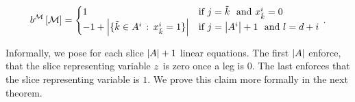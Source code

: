 \begin{align}\label{eq:ilpRhs}
	\rhsofat{\sliceset}{\datvariable=\datanum_{\decindex}+\datindex} =
	\begin{cases}
		1 & \text{if }  \datindex = \seccatenumerator \text{ and } \catindexof{\seccatenumerator}^{\decindex} = 0 \\ %
		-1 + \cardof{\{\seccatenumerator\in\variablesetof{\decindex} \, : \,  \catindexof{\seccatenumerator}^{\decindex} = 1\}}  & \text{if }  \datindex = \cardof{\variablesetof{\decindex}} + 1  \text{ and }  \selindex = \catorder + \decindex \\ %
	\end{cases} \, . 
\end{align}


Informally, we pose for each slice $\left|A\right|+1$ linear equations. 
The first $\left|A\right|$ enforce, that the slice representing variable $z$ is zero once a leg is $0$.
The last enforces that the slice representing variable is $1$. 
We prove this claim more formally in the next theorem.

